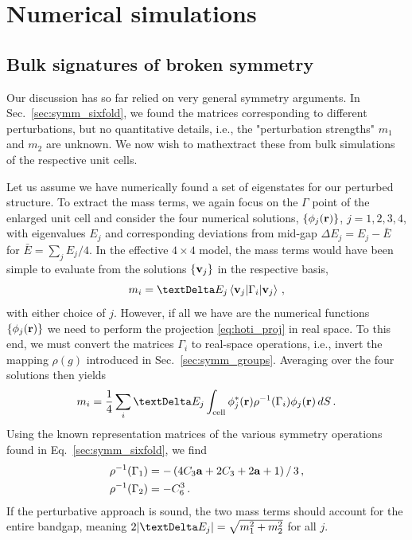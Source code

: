 \section{Numerical simulations}

\subsection{Bulk signatures of broken symmetry} \label{sec:hoti_bulk}

Our discussion has so far relied on very general symmetry arguments. In Sec.~\ref{sec:symm_sixfold}, we found the matrices corresponding to different perturbations, but no quantitative details, i.e., the "perturbation strengths" $m_1$ and $m_2$ are unknown. We now wish to mathextract these from bulk simulations of the respective unit cells.

Let us assume we have numerically found a set of eigenstates for our perturbed structure. To extract the mass terms, we again focus on the $\Gamma$ point of the enlarged unit cell and consider the four numerical solutions, $\{ \phi_j(\vb{r})\}$, $j=1,2,3,4$, with eigenvalues $E_j$ and corresponding deviations from mid-gap $\Delta E_j=E_j-\bar{E}$ for $\bar{E}=\sum_j E_j/4$. In the effective $4 \times 4$ model, the mass terms would have been simple to evaluate from the solutions $\{ \vb{v}_j \}$ in the respective basis,
\begin{equation} \label{eq:hoti_proj}
m_i = \Delta E_j \expval{\Gamma_i}{\vb{v}_j} \,,
\end{equation}
with either choice of $j$. 
However, if all we have are the numerical functions $\{ \phi_j (\vb{r}) \}$ we need to perform the projection \eqref{eq:hoti_proj} in real space. To this end, we must convert the matrices $\Gamma_i$ to real-space operations, i.e., invert the mapping $\rho(g)$ introduced in Sec.~\ref{sec:symm_groups}. Averaging over the four solutions then yields
\begin{equation}
\label{eq:hoti_massformula}
m_i = \frac{1}{4} \sum_i \Delta E_j  \int_{\text{cell}} \phi_j^*(\vb{r}) \rho^{-1}(\Gamma_i) \phi_j(\vb{r})  \, dS\,.
\end{equation}
Using the known representation matrices of the various symmetry operations found in Eq.~\eqref{sec:symm_sixfold}, we find
\begin{equation} \label{eq:hoti_bulksig}
\begin{aligned}
\rho^{-1}(\Gamma_1) &= -\left(4C_3 \vb{a} + 2 C_3 + 2 \vb{a} + 1 \right) /\, 3\,, \\
\rho^{-1}(\Gamma_2) &= -C_6^3\,.
\end{aligned}
\end{equation}
If the perturbative approach is sound, the two mass terms should account for the entire bandgap, meaning $2\abs{\Delta E_j} = \sqrt{m_1^2 + m_2^2}$ for all $j$.

